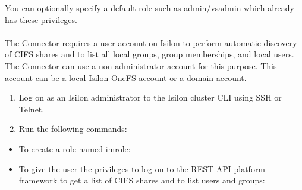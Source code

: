 \documentclass[letterpaper,10pt,english]{sphinxmanual}
\begin{document}
You can optionally specify a default role such as admin/vsadmin which already has these privileges.


\paragraph{}
\label{\detokenize{mcdmp_app_ug:creating-a-non-administrator-user-for-an-emc-isilon-cluster}}
The Connector requires a user account on Isilon to perform automatic discovery of CIFS shares and to list all local groups, group memberships, and local users. The Connector can use a non-administrator account for this purpose. This account can be a local Isilon OneFS account or a domain account.

\begin{enumerate}
\item {} 
Log on as an Isilon administrator to the Isilon cluster CLI using SSH or Telnet.

\item {} 
Run the following commands:

\end{enumerate}
\begin{itemize}
\item {} 
To create a role named imrole:

\end{itemize}
\begin{quote}

\end{quote}
\begin{itemize}
\item {} 
To give the user the privileges to log on to the REST API platform framework to get a list of CIFS shares and to list users and groups:

\end{itemize}
\begin{quote}



\end{quote}
\end{document}
